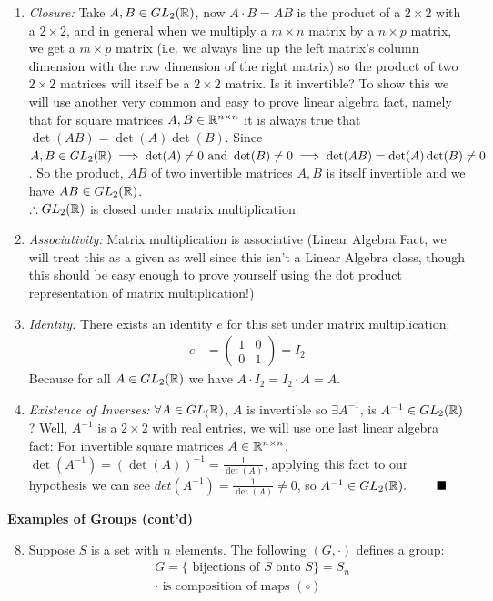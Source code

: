 \begin{enumerate}[label=(\roman*)]
    \item \textit{Closure:} Take $A,B\in GL_2({\mathbb{ R}})$, now $A\cdot B=AB$ is the product of a $2\times 2$ with a $2\times 2$, and in general when we multiply a $m\times n$ matrix by a $n\times p$ matrix, we get a $m\times p$ matrix (i.e. we always line up the left matrix's column dimension with the row dimension of the right matrix) so the product of two $2\times 2$ matrices will itself be a $2\times 2$ matrix. Is it invertible? To show this we will use another very common and easy to prove linear algebra fact, namely that for square matrices $A,B \in {\mathbb{ R}}^{n\times n}$ it is always true that $\det(AB)=\det(A)\det(B)$. Since $A,B\in GL_2({\mathbb{ R}}) \implies \det(A)\neq 0 \text{ and } \det(B)\neq 0 \implies \det(AB)=\det(A)\det(B)\neq 0$. So the product, $AB$ of two invertible matrices $A,B$ is itself invertible and we have $AB\in GL_2({\mathbb{ R}})$. \\ $\therefore GL_2({\mathbb{ R}})$ is closed under matrix multiplication.
    \item \textit{Associativity: } Matrix multiplication is associative (Linear Algebra Fact, we will treat this as a given as well since this isn't a Linear Algebra class, though this should be easy enough to prove yourself using the dot product representation of matrix multiplication!)
    \item \textit{Identity: }There exists an identity $e$ for this set under matrix multiplication:
    \begin{align}
        e&=\left(\begin{matrix}
1 & 0 \\
0 & 1 
\end{matrix}\right) = I_2\nonumber 
    \end{align}
    Because for all $A\in GL_2({\mathbb{ R}})$ we have $A\cdot I_2=I_2\cdot A = A$.
    \item \textit{Existence of Inverses: }$\forall A \in GL_({\mathbb{ R}})$, $A$ is invertible so $\exists A^{-1}$, is $A^{-1}\in GL_2({\mathbb{ R}})$? Well, $A^{-1}$ is a $2\times 2$ with real entries, we will use one last linear algebra fact: For invertible square matrices $A\in {\mathbb{ R}}^{n\times n}$, $\det(A^{-1})=(\det(A))^{-1}=\frac{1}{\det(A)}$, applying this fact to our hypothesis we can see $det(A^{-1})=\frac{1}{\det(A)}\neq 0$, so $A^{-1}\in GL_2(\R). \ \ \ \ \ \ \ \blacksquare$
\end{enumerate}\steezybreak
\noindent\textbf{Examples of Groups (cont'd)}
\noindent\begin{enumerate}
\setcounter{enumi}{7}
    \item Suppose $S$ is a set with $n$ elements. The following $(G,\cdot)$ defines a group:
    \begin{align}
        &G= \{\text{ bijections of } S \text{ onto } S\} = S_n \nonumber \\
        &\cdot \text{ is composition of maps } (\circ) \nonumber
    \end{align}
\end{enumerate}
